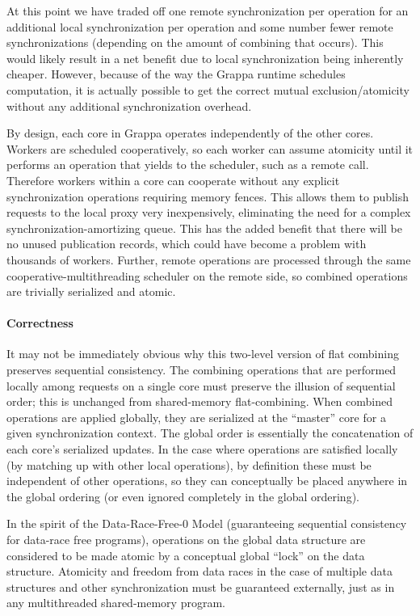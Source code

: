 At this point we have traded off one remote synchronization per operation for an additional local synchronization per operation and some number fewer remote synchronizations (depending on the amount of combining that occurs). This would likely result in a net benefit due to local synchronization being inherently cheaper. However, because of the way the Grappa runtime schedules computation, it is actually possible to get the correct mutual exclusion/atomicity without any additional synchronization overhead.

By design, each core in Grappa operates independently of the other cores. Workers are scheduled cooperatively, so each worker can assume atomicity until it performs an operation that yields to the scheduler, such as a remote call. Therefore workers within a core can cooperate without any explicit synchronization operations requiring memory fences. This allows them to publish requests to the local  proxy very inexpensively, eliminating the need for a complex synchronization-amortizing queue. This has the added benefit that there will be no unused publication records, which could have become a problem with thousands of workers. Further, remote operations are processed through the same cooperative-multithreading scheduler on the remote side, so combined operations are trivially serialized and atomic.

\paragraph{Correctness}

It may not be immediately obvious why this two-level version of flat combining preserves sequential consistency. The combining operations that are performed locally among requests on a single core must preserve the illusion of sequential order; this is unchanged from shared-memory flat-combining. When combined operations are applied globally, they are serialized at the ``master'' core for a given synchronization context. The global order is essentially the concatenation of each core's serialized updates. In the case where operations are satisfied locally (by matching up with other local operations), by definition these must be independent of other operations, so they can conceptually be placed anywhere in the global ordering (or even ignored completely in the global ordering).

In the spirit of the Data-Race-Free-0 Model (guaranteeing sequential consistency for data-race free programs), operations on the global data structure are considered to be made atomic by a conceptual global ``lock'' on the data structure. Atomicity and freedom from data races in the case of multiple data structures and other synchronization must be guaranteed externally, just as in any multithreaded shared-memory program.

